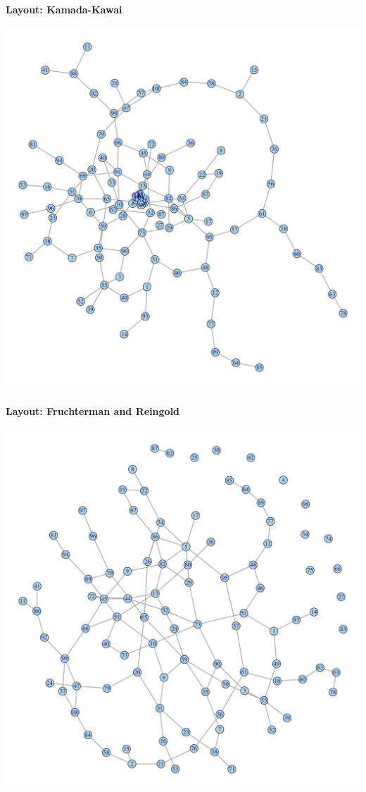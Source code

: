\documentclass[8pt]{beamer}
\begin{document}
\begin{frame}
\frametitle{\insertsection}
\framesubtitle{Layout: Kamada-Kawai}

\centering
\includegraphics[height=0.85\textheight]{kamada}
 
\end{frame}


\begin{frame}
\frametitle{\insertsection}
\framesubtitle{Layout: Fruchterman and Reingold}

\centering
\includegraphics[height=0.85\textheight]{fr}
 
\end{frame}
\end{document}
